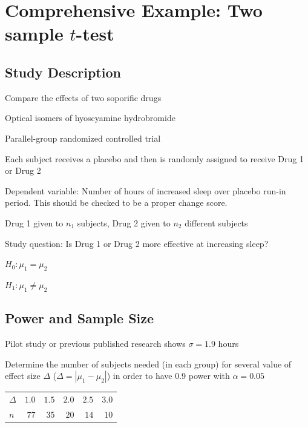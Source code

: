 \section{Comprehensive Example: Two sample $t$-test}

\subsection{Study Description}

\bi
\item Compare the effects of two soporific drugs
 \bi
 \item Optical isomers of hyoscyamine hydrobromide
 \ei
\item Parallel-group randomized controlled trial
\item Each subject receives a placebo and then is randomly assigned to receive Drug 1 or Drug 2
\item Dependent variable: Number of hours of increased sleep over
  placebo run-in period.  This should be checked to be a proper change score.

\item Drug 1 given to $n_1$ subjects, Drug 2 given to $n_2$ different subjects
\item Study question: Is Drug 1 or Drug 2 more effective at increasing sleep?
  \bi
  \item $H_0: \mu_1 = \mu_2$
  \item $H_1: \mu_1 \neq \mu_2$
  \ei
\ei

\subsection{Power and Sample Size}

\bi
\item Pilot study or previous published research shows $\sigma = 1.9$ hours
\item Determine the number of subjects needed (in each group) for several value of effect size $\Delta$ ($\Delta = |\mu_1 - \mu_2|$) in order to have 0.9 power with $\alpha = 0.05$
\ei

\begin{table}[!hbp]
 \begin{center}
 \begin{tabular}{lrrrrr} \hline\hline
$\Delta$ &$ 1.0$&$ 1.5$&$ 2.0$&$2.5$ & $3.0$ \\ 
$n$ &$77$&$35$&$20$&$14$&$10$ \\\hline \hline
\end{tabular}
\end{center}

\end{table}

